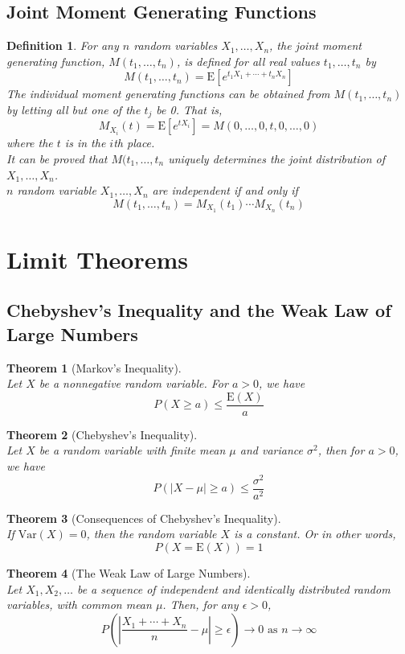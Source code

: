 \documentclass[12pt]{article}
\newcommand{\var}{\mathrm{Var}}
\newcommand{\expec}{\mathrm{E}}
\newtheorem{definition}{Definition}[section]
\newtheorem{theorem}{Theorem}[section]
\theoremstyle{definition}
\begin{document}
\subsection{Joint Moment Generating Functions}
\begin{definition}
\normalfont For any $n$ random variables $X_1,\ldots, X_n$, the joint moment generating function, $M(t_1, \ldots, t_n)$, is defined for all real values $t_1,\ldots, t_n$ by
\[
M(t_1,\ldots, t_n)=\expec[e^{t_1X_1+\cdots+t_nX_n}]
\]
The individual moment generating functions can be obtained from $M(t_1,\ldots, t_n)$ by letting all but one of the $t_j$ be 0. That is,
\[
M_{X_i}(t)=\expec[e^{tX_i}]=M(0,\ldots,0,t,0,\ldots, 0)
\]
where the $t$ is in the $i$th place.\\
It can be proved that $M(t_1,\ldots, t_n$ uniquely determines the joint distribution of $X_1,\ldots, X_n$.\\
$n$ random variable $X_1,\ldots, X_n$ are independent if and only if
\[
M(t_1, \ldots, t_n)=M_{X_1}(t_1)\cdots M_{X_n}(t_n)
\]
\end{definition}
\clearpage
\section{Limit Theorems}
\subsection{Chebyshev's Inequality and the Weak Law of Large Numbers}
\begin{theorem}[Markov's Inequality]
\hfill\\\normalfont Let $X$ be a nonnegative random variable. For $a>0$, we have
\[
P(X\geq a)\leq \frac{\expec(X)}{a}
\]
\end{theorem}
\begin{theorem}[Chebyshev's Inequality]
\hfill\\\normalfont Let $X$ be a random variable with finite mean $\mu$ and variance $\sigma^2$, then for $a>0$, we have
\[
P(|X-\mu|\geq a)\leq \frac{\sigma^2}{a^2}
\]
\end{theorem}
\begin{theorem}[Consequences of Chebyshev's Inequality]
\hfill\\\normalfont If $\var(X)=0$, then the random variable $X$ is a constant. Or in other words,
\[
P(X=\expec(X))=1
\]
\end{theorem}
\begin{theorem}[The Weak Law of Large Numbers]
\hfill\\\normalfont Let $X_1, X_2,\ldots$ be a sequence of independent and identically distributed random variables, with common mean $\mu$. Then, for any $\epsilon>0$,
\[
P\left(\left|\frac{X_1+\cdots+X_n}{n}-\mu\right|\geq \epsilon\right)\to 0\text{ as }n\to \infty
\]
\end{theorem}
\end{document}
